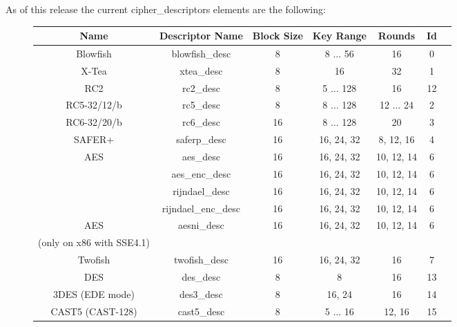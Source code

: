 \documentclass[synpaper]{book}
\begin{document}
As of this release the current cipher\_descriptors elements are the following:
\vfil
{}
       
         
  
\begin{figure}[hpbt]
\begin{small}
\begin{center}
\begin{tabular}{|c|c|c|c|c|c|c|}
     \hline \textbf{Name} & \textbf{Descriptor Name} & \textbf{Block Size} & \textbf{Key Range} & \textbf{Rounds} & \textbf{Id} \\
     \hline Blowfish & blowfish\_desc & 8 & 8 $\ldots$ 56 & 16 & 0 \\
     \hline X-Tea & xtea\_desc & 8 & 16 & 32 & 1 \\
     \hline RC2 & rc2\_desc & 8 & 5 $\ldots$ 128 & 16 & 12 \\
     \hline RC5-32/12/b & rc5\_desc & 8 & 8 $\ldots$ 128 & 12 $\ldots$ 24 & 2 \\
     \hline RC6-32/20/b & rc6\_desc & 16 & 8 $\ldots$ 128 & 20 & 3 \\
     \hline SAFER+ & saferp\_desc &16 & 16, 24, 32 & 8, 12, 16 & 4 \\
     \hline AES & aes\_desc & 16 & 16, 24, 32 & 10, 12, 14 & 6 \\
                & aes\_enc\_desc & 16 & 16, 24, 32 & 10, 12, 14 & 6 \\
                & rijndael\_desc & 16 & 16, 24, 32 & 10, 12, 14 & 6 \\
                & rijndael\_enc\_desc & 16 & 16, 24, 32 & 10, 12, 14 & 6 \\
     \hline AES & aesni\_desc & 16 & 16, 24, 32 & 10, 12, 14 & 6 \\
            (only on x86 with SSE4.1) &&&&& \\
     \hline Twofish & twofish\_desc & 16 & 16, 24, 32 & 16 & 7 \\
     \hline DES & des\_desc & 8 & 8 & 16 & 13 \\
     \hline 3DES (EDE mode) & des3\_desc & 8 & 16, 24 & 16 & 14 \\
     \hline CAST5 (CAST-128) & cast5\_desc & 8 & 5 $\ldots$ 16 & 12, 16 & 15 \\

\end{tabular}
\end{center}
\end{small}
\end{figure}
\end{document}
